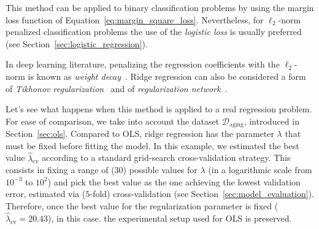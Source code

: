 			This method can be applied to binary classification problems by using the margin loss function of Equation~\eqref{eq:margin_square_loss}. Nevertheless, for $\ell_2$-norm penalized classification problems the use of the \textit{logistic loss} is usually preferred (see Section~\ref{sec:logistic_regression}).

			In deep learning literature, penalizing the regression coefficients with the $\ell_2$-norm is known as \textit{weight decay}~\cite{krogh1992simple}. Ridge regression can also be considered a form of  \textit{Tikhonov regularization}~\cite{tikhonov1963solution} and of \textit{regularization network}~\cite{evgeniou2000regularization}.

			Let's see what happens when this method is applied to a real regression problem. For ease of comparison, we take into account the dataset $\mathcal{D}_{\text{aging}}$, introduced in Section~\ref{sec:ols}.
			Compared to OLS, ridge regression has the parameter $\lambda$ that must be fixed before fitting the model. In this example, we estimated the best value $\hat \lambda_{\text{cv}}$ according to a standard grid-search cross-validation strategy. %
			This consists in fixing a range of ($30$) possible values for $\lambda$ (in a logarithmic scale from $10^{-3}$ to $10^2$) and
			pick the best value as the one achieving the lowest validation error, estimated via ($5$-fold) cross-validation (see Section~\ref{sec:model_evaluation}).
			Therefore, once the best value for the regularization parameter is fixed ($\hat \lambda_{\text{cv}} = 20.43$), in this case. the experimental setup used for OLS is preserved.
			
